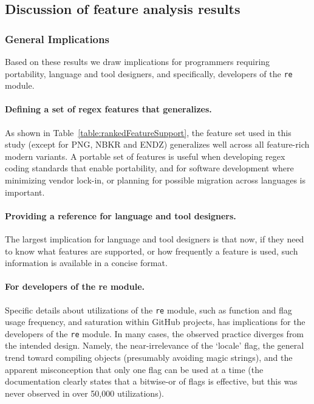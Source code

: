 \subsection{Discussion of feature analysis results}
\label{sec:featureDiscussion}

\subsubsection{General Implications}
Based on these results we draw implications for programmers requiring portability, language and tool designers, and specifically, developers of the {\tt re} module.

\paragraph{Defining a set of regex features that generalizes.} As shown in Table~\ref{table:rankedFeatureSupport}, the feature set used in this study (except for PNG, NBKR and ENDZ) generalizes well across all feature-rich modern variants.  A portable set of features is useful when developing regex coding standards that enable portability, and for software development where minimizing vendor lock-in, or planning for possible migration across languages is important.

\paragraph{Providing a reference for language and tool designers.} The largest implication for language and tool designers is that now, if they need to know what features are supported, or how frequently a feature is used, such information is available in a concise format.

\paragraph{For developers of the re module.} Specific details about utilizations of the {\tt re} module, such as function and flag usage frequency, and saturation within GitHub projects, has implications for the developers of the {\tt re} module.  In many cases, the observed practice diverges from the intended design.  Namely, the near-irrelevance of the `locale' flag, the general trend toward compiling objects (presumably avoiding magic strings), and the apparent misconception that only one flag can be used at a time (the documentation clearly states that a bitwise-or of flags is effective, but this was never observed in over 50,000 utilizations).

